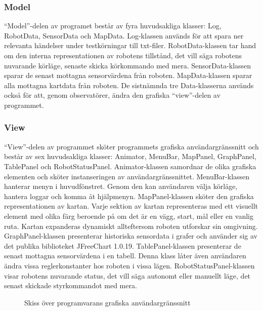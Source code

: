 \documentclass[11pt]{article}
\begin{document}
\begin{flushleft}
\subsubsection{Model}
``Model''-delen av programet består av fyra huvudsakliga klasser: Log, RobotData, SensorData och MapData. 
Log-klassen används för att spara ner relevanta händelser under testkörningar till txt-filer. 
RobotData-klassen tar hand om den interna representationen av robotens tillstånd, det vill säga robotens nuvarande körläge, senaste skicka körkommando med mera. 
SensorData-klassen sparar de senast mottagna sensorvärdena från roboten. 
MapData-klassen sparar alla mottagna kartdata från roboten. De sistnämnda tre Data-klasserna används också för att, genom observatörer, ändra den grafiska ``view''-delen av programmet.

\subsubsection{View}
``View''-delen av programmet sköter programmets grafiska användargränssnitt och består av sex huvudsakliga klasser: Animator, MenuBar, MapPanel, GraphPanel, TablePanel och RobotStatusPanel. Animator-klassen samordnar de olika grafiska elementen och sköter instanseringen av användargränssnittet. 
MenuBar-klassen hanterar menyn i huvudfönstret. Genom den kan användaren välja körläge, hantera loggar och komma åt hjälpmenyn. 
MapPanel-klassen sköter den grafiska representationen av kartan. Varje sektion av kartan representeras med ett visuellt element med olika färg beroende på om det är en vägg, start, mål eller en vanlig ruta. Kartan expanderas dynamiskt allteftersom roboten utforskar sin omgivning. 
GraphPanel-klassen presenterar historiska sensordata i grafer och använder sig av det publika biblioteket JFreeChart 1.0.19. 
TablePanel-klassen presenterar de senast mottagna sensorvärdena i en tabell. Denna klass låter även användaren ändra vissa reglerkonstanter hos roboten i vissa lägen.
RobotStatusPanel-klassen visar robotens nuvarande status, det vill säga autonomt eller manuellt läge, det senast skickade styrkommandot med mera.

\begin{figure}[H]
\centering
\noindent\resizebox{.8\linewidth}{!}{
	}
	\caption{Skiss över programvarans grafiska användargränssnitt\label{software}}	
\end{figure}


\end{flushleft}
\end{document}
